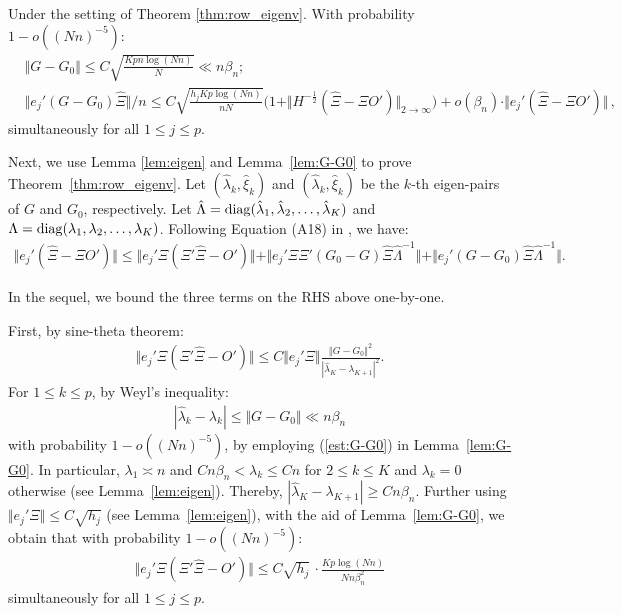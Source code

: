\documentclass[preprint,11pt]{article}
\numberwithin{equation}{section}
\begin{document}
\begin{lemma} \label{lem:G-G0}
Under the setting of Theorem \ref{thm:row_eigenv}. With probability $1- o((Nn)^{-5})$:
\begin{align}
&\Vert G- G_0 \Vert  \leq  C\sqrt{\frac{Kpn\log(Nn)}{N}} \ll n\beta_n;   \label{est:G-G0}
  \\ 
&
\Vert e_j'(G- G_0) \hat \Xi \Vert/n \leq C \sqrt{\frac{h_j Kp\log (Nn)}{nN}}  \bigg(1+ \Vert H^{-\frac 12}  (\hat \Xi-\Xi O') \Vert_{2\to \infty} \bigg)+ o(\beta_n) \cdot \Vert e_j' (\hat \Xi-\Xi O')\Vert \, , \label{est:jG-G0}
\end{align}
simultaneously for all $1\leq j \leq p$. 
\end{lemma}


Next, we use Lemma \ref{lem:eigen} and Lemma~\ref{lem:G-G0} to prove Theorem~\ref{thm:row_eigenv}. 
Let $(\hat \lambda_k, \hat \xi_k)$ and $(\hat \lambda_k, \hat \xi_k)$ be the $k$-th eigen-pairs of $G$ and $G_0$, respectively. Let $\hat \Lambda = {\rm diag} (\hat \lambda_1, \hat \lambda_2, \ldots, \hat \lambda_K)$ and $\Lambda = {\rm diag} ( \lambda_1,  \lambda_2, \ldots,  \lambda_K)$. Following Equation (A18) in \cite{ke2024entry}, we have:
\begin{align}\label{2022041901}
\Vert e_j' (\hat \Xi- \Xi O')   \Vert  \leq \Vert  e_j' \Xi (\Xi' \hat \Xi - O') \Vert  + \Vert e_j' \Xi \Xi' (G_0- G) \hat \Xi  \hat \Lambda^{-1}\Vert +  \Vert e_j'(G- G_0) \hat \Xi \hat \Lambda^{-1} \Vert.
\end{align}

In the sequel, we bound the three terms on the RHS above  one-by-one. 

First, by sine-theta theorem:
\begin{align*}
\Vert  e_j' \Xi (\Xi' \hat \Xi - O') \Vert \leq C \Vert e_j' \Xi \Vert \frac{\Vert G-G_0\Vert^2 }{|\hat \lambda_K- \lambda_{K+1}|^2}.
\end{align*}
For $1\leq k \leq  p $, by Weyl's inequality:
\begin{align}\label{ineq:weyl_lambda}
| \hat \lambda_k - \lambda_k| \leq \Vert G - G_0\Vert  \ll n \beta_n
\end{align}
with probability $1- o((Nn)^{-5})$, by employing (\ref{est:G-G0}) in Lemma~\ref{lem:G-G0}. In
particular,  $\lambda_1\asymp n $ and $Cn \beta_n<\lambda_k\leq Cn$ for $2\leq k\leq K$ and $\lambda_k=0$ otherwise (see Lemma~\ref{lem:eigen}). Thereby,  $|\hat \lambda_K- \lambda_{K+1}|\geq C n \beta_n$.  Further using  $\Vert e_j' \Xi\Vert \leq C\sqrt{h_j}$ (see Lemma~\ref{lem:eigen}),
with the aid of Lemma~\ref{lem:G-G0}, we obtain that with probability $1- o((Nn)^{-5})$:
\begin{align}\label{est:Term1}
\Vert  e_j' \Xi (\Xi'\hat \Xi - O') \Vert \leq C\sqrt{h_j} \,\cdot  \frac{Kp\log (Nn)}{Nn\beta_n^2} 
\end{align}
simultaneously for all $1\leq j \leq p$.
\end{document}
